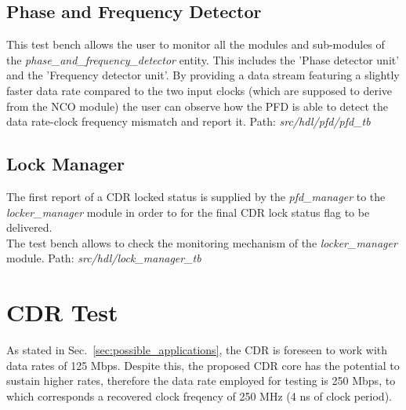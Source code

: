\documentclass[11pt]{article}
\renewcommand{\>}{\rangle} \renewcommand{\emptyset}{\varnothing}
\begin{document}
\subsection{Phase and Frequency Detector}
This test bench allows the user to monitor all the modules and sub-modules of
the \textit{phase\_and\_frequency\_detector} entity. This includes the 'Phase
detector unit' and the 'Frequency detector unit'. By providing a data stream
featuring a slightly faster data rate compared to the two input clocks (which
are supposed to derive from the NCO module) the user can observe how the PFD is
able to detect the data rate-clock frequency mismatch and report it.\bigbreak
Path: \textit{src/hdl/pfd/pfd\_tb}

\subsection{Lock Manager}
The first report of a CDR locked status is supplied by the \textit{pfd\_manager}
to the \textit{locker\_manager} module in order to for the final CDR lock status
flag to be delivered.\\
The test bench allows to check the monitoring mechanism of the
\textit{locker\_manager} module. \bigbreak Path:
\textit{src/hdl/lock\_manager\_tb}

\section{CDR Test} \label{sec:cdr_test} As stated in
Sec.~\ref{sec:possible_applications}, the CDR is foreseen to work with data
rates of 125 Mbps. Despite this, the proposed CDR core has the potential to
sustain higher rates, therefore the data rate employed for testing is 250 Mbps,
to which corresponds a recovered clock freqency of 250 MHz (4 ns of clock
period).
\end{document}
